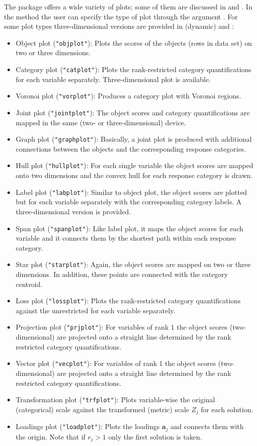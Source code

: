 \documentclass[article]{Z}
\begin{document}
The package offers a wide variety of plots; some of them are discussed in \citet{Michailidis+deLeeuw:98} and \citet{ Michailidis+deLeeuw:01}. In the  method the user can specify the type of plot through the argument . For some plot types three-dimensional versions are provided in  (dynamic) and :
\begin{itemize}
\item Object plot (\texttt{"objplot"}): Plots the scores of the objects (rows in data set) on two or three dimensions. 
\item Category plot (\texttt{"catplot"}): Plots the rank-restricted category quantifications for each variable separately. Three-dimensional plot is available.
\item Voronoi plot (\texttt{"vorplot"}): Produces a category plot with Voronoi regions.
\item Joint plot (\texttt{"jointplot"}): The object scores and category quantifications are mapped in the same (two- or three-dimensional) device.
\item Graph plot (\texttt{"graphplot"}): Basically, a joint plot is produced with additional connections between the objects and the corresponding response categories.
\item Hull plot (\texttt{"hullplot"}): For each single variable the object scores are mapped onto two dimensions and the convex hull for each response category is drawn.
\item Label plot (\texttt{"labplot"}): Similar to object plot, the object scores are plotted but for each variable separately with the corresponding category labels. A three-dimensional version is provided.
\item Span plot (\texttt{"spanplot"}): Like label plot, it maps the object scores for each variable and it connects them by the shortest path within each response category.
\item Star plot (\texttt{"starplot"}): Again, the object scores are mapped on two or three dimensions. In addition, these points are connected with the category centroid. 
\item Loss plot (\texttt{"lossplot"}): Plots the rank-restricted category quantifications against the unrestricted for each variable separately.
\item Projection plot (\texttt{"prjplot"}): For variables of rank 1 the object scores (two-dimensional) are projected onto a straight line determined by the rank restricted category quantifications.
\item Vector plot (\texttt{"vecplot"}): For variables of rank 1 the object scores (two-dimensional) are projected onto
a straight line determined by the rank restricted category quantifications.  
\item Transformation plot (\texttt{"trfplot"}): Plots variable-wise the original (categorical) scale against the transformed (metric) scale $Z_j$ for each solution.
\item Loadings plot (\texttt{"loadplot"}): Plots the loadings $\mathbf{a}_j$ and connects them with the origin. Note that if $r_j > 1$ only the first solution is taken.
\end{itemize} 
\end{document}

